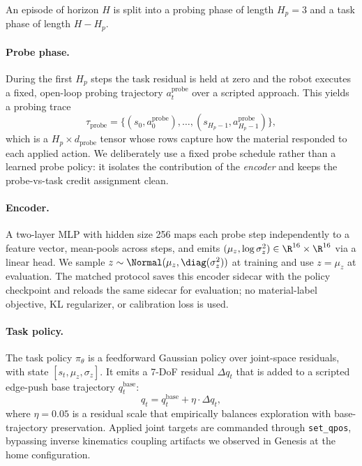 An episode of horizon $H$ is split into a probing phase of length $H_p = 3$ and a task phase of length $H - H_p$.

\paragraph{Probe phase.}
During the first $H_p$ steps the task residual is held at zero and the robot executes a fixed, open-loop probing trajectory $a^{\mathrm{probe}}_t$ over a scripted approach. This yields a probing trace
\begin{equation}
    \tau_{\mathrm{probe}} = \{(s_0, a^{\mathrm{probe}}_0), \dots, (s_{H_p-1}, a^{\mathrm{probe}}_{H_p-1})\},
\end{equation}
which is a $H_p \times d_{\mathrm{probe}}$ tensor whose rows capture how the material responded to each applied action. We deliberately use a fixed probe schedule rather than a learned probe policy: it isolates the contribution of the \emph{encoder} and keeps the probe-vs-task credit assignment clean.

\paragraph{Encoder.}
A two-layer MLP with hidden size 256 maps each probe step independently to a feature vector, mean-pools across steps, and emits $(\mu_z, \log \sigma_z^2) \in \R^{16} \times \R^{16}$ via a linear head. We sample $z \sim \Normal(\mu_z, \diag(\sigma_z^2))$ at training and use $z = \mu_z$ at evaluation. The matched protocol saves this encoder sidecar with the policy checkpoint and reloads the same sidecar for evaluation; no material-label objective, KL regularizer, or calibration loss is used.

\paragraph{Task policy.}
The task policy $\pi_\theta$ is a feedforward Gaussian policy over joint-space residuals, with state $[s_t, \mu_z, \sigma_z]$. It emits a 7-DoF residual $\Delta q_t$ that is added to a scripted edge-push base trajectory $q^{\mathrm{base}}_t$:
\begin{equation}
    q_t = q^{\mathrm{base}}_t + \eta \cdot \Delta q_t,
\end{equation}
where $\eta = 0.05$ is a residual scale that empirically balances exploration with base-trajectory preservation. Applied joint targets are commanded through \texttt{set\_qpos}, bypassing inverse kinematics coupling artifacts we observed in Genesis at the home configuration.

